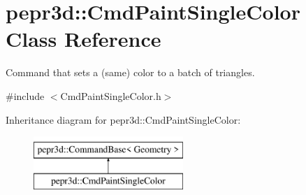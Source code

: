 \hypertarget{classpepr3d_1_1_cmd_paint_single_color}{}\section{pepr3d\+::Cmd\+Paint\+Single\+Color Class Reference}
\label{classpepr3d_1_1_cmd_paint_single_color}


Command that sets a (same) color to a batch of triangles.  




{\ttfamily \#include $<$Cmd\+Paint\+Single\+Color.\+h$>$}

Inheritance diagram for pepr3d\+::Cmd\+Paint\+Single\+Color\+:\begin{figure}[H]
\begin{center}
\leavevmode
\includegraphics[height=2.000000cm]{classpepr3d_1_1_cmd_paint_single_color}
\end{center}
\end{figure}
